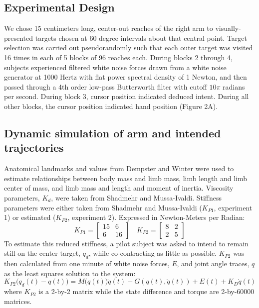 \documentclass{frontiersSCNS} %
\begin{document}
\begin{methods}
\subsection{Experimental Design}
We chose 15 centimeters long, center-out reaches of the right arm to visually-presented targets chosen at 60 degree intervals about that central point. Target selection was carried out pseudorandomly such that each outer target was visited 16 times in each of 5 blocks of 96 reaches each. During blocks 2 through 4, subjects experienced filtered white noise forces drawn from a white noise generator at 1000 Hertz with flat power spectral density of 1 Newton, and then passed through a 4th order low-pass Butterworth filter with cutoff $10 \pi$ radians per second. During block 3, cursor position indicated deduced intent. During all other blocks, the cursor position indicated hand position (Figure 2A).

\subsection{Dynamic simulation of arm and intended trajectories}
Anatomical landmarks and values from Dempster \cite{dempster1955space} and Winter \cite{winter2009biomechanics} were used to estimate relationships between body mass and limb mass, limb length and limb center of mass, and limb mass and length and moment of inertia. Viscosity parameters, $K_d$, were taken from Shadmehr and Mussa-Ivaldi\cite{shadmehr1994adaptive}. Stiffness parameters were either taken from Shadmehr and Mussa-Ivaldi\cite{shadmehr1994adaptive} ($K_{P1}$, experiment 1) or estimated ($K_{P2}$, experiment 2). Expressed in Newton-Meters per Radian:
\begin{equation}
K_{P1}=
\begin{bmatrix}
15 & 6 \\
6 & 16
\end{bmatrix}
\quad
K_{P2}=
\begin{bmatrix}
8 & 2 \\
2 & 5
\end{bmatrix}
\end{equation}
To estimate this reduced stiffness, a pilot subject was asked to intend to remain still on the center target, $q_d$, while co-contracting as little as possible. $K_{P2}$ was then calculated from one minute of white noise forces, $E$, and joint angle traces, $q$ as the least squares solution to the system:
\begin{equation}
K_{P2}\big(q_d(t)-q(t)\big)=M\big(q(t)\big)\ddot{q}(t)+G(q(t),\dot{q}(t))+E(t)+K_D\dot{q}(t)
\end{equation}
where $K_{P2}$ is a 2-by-2 matrix while the state difference and torque are 2-by-60000 matrices.


\end{methods}
\end{document}
